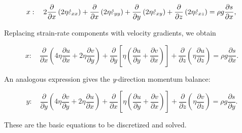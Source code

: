 \begin{equation}
  x: \quad 2\frac{\partial }{\partial x}\left( 2\eta \dot{\varepsilon }_{xx} \right) + \frac{\partial }{\partial x}\left( 2\eta \dot{\varepsilon }_{yy
} \right) + \frac{\partial }{\partial y}\left( 2\eta \dot{\varepsilon }_{xy} \right) + \frac{\partial }{\partial z}\left( 2\eta \dot{\varepsilon }_{xz} 
\right) = \rho g\frac{\partial s}{\partial x}, \\ 
\end{equation}

\noindent
Replacing strain-rate components with velocity gradients, we obtain

\begin{equation}
  \label{ho.eq.stress_balance_final_x}
  x: \quad \frac{\partial }{\partial x}\left( 4 \eta \frac{\partial u}{\partial x} +  2 \eta \frac{\partial v}{\partial y} \right) + \frac{\partial }{\partial y}\left[ \eta \left( \frac{\partial u}{\partial y} + \frac{\partial v}{\partial x} \right) \right]+\frac{\partial }{\partial z}\left( \eta \frac{\partial u}{\partial z} \right) = \rho g\frac{\partial s}{\partial x}.
\end{equation}

\noindent
An analogous expression gives the \textit{y}-direction momentum balance: 

\begin{equation}
  \label{ho.eq.stress_balance_final_y}
  y: \quad \frac{\partial }{\partial y}\left( 4 \eta \frac{\partial v}{\partial y} +  2 \eta \frac{\partial u}{\partial x} \right) + \frac{\partial }{\partial x}\left[ \eta \left( \frac{\partial u}{\partial y} + \frac{\partial v}{\partial x} \right) \right]+\frac{\partial }{\partial z}\left( \eta \frac{\partial v}{\partial z} \right) = \rho g\frac{\partial s}{\partial y}.  
\end{equation}

\noindent
These are the basic equations to be discretized and solved.



